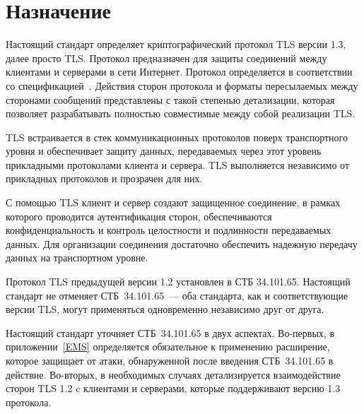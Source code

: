 \section{Назначение}\label{COMMON.Purpose}

Настоящий стандарт определяет криптографический протокол TLS версии 1.3,
далее просто TLS.
%
Протокол предназначен для защиты соединений между клиентами и серверами в сети 
Интернет.
%
Протокол определяется в соответствии со спецификацией~\cite{RFC8446}.
%
Действия сторон протокола и форматы пересылаемых между сторонами сообщений
представлены с такой степенью детализации, которая позволяет разрабатывать
полностью совместимые между собой реализации TLS.

TLS встраивается в стек коммуникационных протоколов поверх транспортного
уровня и обеспечивает защиту данных, передаваемых через этот уровень
прикладными протоколами клиента и сервера. TLS выполняется независимо от
прикладных протоколов и прозрачен для них.

С помощью TLS клиент и сервер создают защищенное соединение, в рамках которого
проводится аутентификация сторон, обеспечиваются конфиденциальность и контроль 
целостности и подлинности передаваемых данных.
%
Для организации соединения достаточно обеспечить надежную передачу данных на 
транспортном уровне.


Протокол TLS предыдущей версии 1.2 установлен в СТБ 34.101.65. 
%
Настоящий стандарт не отменяет СТБ~34.101.65~--- оба стандарта, как и 
соответствующие версии TLS, могут применяться одновременно независимо друг от 
друга.


Настоящий стандарт уточняет СТБ~34.101.65 в двух аспектах. Во-первых, в 
приложении~\ref{EMS} определяется обязательное к применению расширение,
которое защищает от атаки, обнаруженной после введения СТБ~34.101.65 в действие.
%
Во-вторых, в необходимых случаях детализируется взаимодействие сторон TLS 1.2 
c клиентами и серверами, которые поддерживают версию 1.3 протокола.

